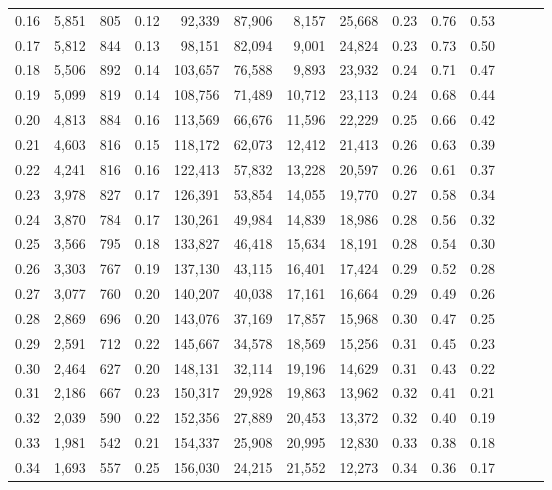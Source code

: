 \begin{tabular}{rrrrrrrrrrrrrr}
0.16 &  5,851 &  805 &  0.12 &   92,339 &   87,906 &   8,157 &  25,668 &  0.23 &  0.76 &      0.53 \\
0.17 &  5,812 &  844 &  0.13 &   98,151 &   82,094 &   9,001 &  24,824 &  0.23 &  0.73 &      0.50 \\
0.18 &  5,506 &  892 &  0.14 &  103,657 &   76,588 &   9,893 &  23,932 &  0.24 &  0.71 &      0.47 \\
0.19 &  5,099 &  819 &  0.14 &  108,756 &   71,489 &  10,712 &  23,113 &  0.24 &  0.68 &      0.44 \\
0.20 &  4,813 &  884 &  0.16 &  113,569 &   66,676 &  11,596 &  22,229 &  0.25 &  0.66 &      0.42 \\
0.21 &  4,603 &  816 &  0.15 &  118,172 &   62,073 &  12,412 &  21,413 &  0.26 &  0.63 &      0.39 \\
0.22 &  4,241 &  816 &  0.16 &  122,413 &   57,832 &  13,228 &  20,597 &  0.26 &  0.61 &      0.37 \\
0.23 &  3,978 &  827 &  0.17 &  126,391 &   53,854 &  14,055 &  19,770 &  0.27 &  0.58 &      0.34 \\
0.24 &  3,870 &  784 &  0.17 &  130,261 &   49,984 &  14,839 &  18,986 &  0.28 &  0.56 &      0.32 \\
0.25 &  3,566 &  795 &  0.18 &  133,827 &   46,418 &  15,634 &  18,191 &  0.28 &  0.54 &      0.30 \\
0.26 &  3,303 &  767 &  0.19 &  137,130 &   43,115 &  16,401 &  17,424 &  0.29 &  0.52 &      0.28 \\
0.27 &  3,077 &  760 &  0.20 &  140,207 &   40,038 &  17,161 &  16,664 &  0.29 &  0.49 &      0.26 \\
0.28 &  2,869 &  696 &  0.20 &  143,076 &   37,169 &  17,857 &  15,968 &  0.30 &  0.47 &      0.25 \\
0.29 &  2,591 &  712 &  0.22 &  145,667 &   34,578 &  18,569 &  15,256 &  0.31 &  0.45 &      0.23 \\
0.30 &  2,464 &  627 &  0.20 &  148,131 &   32,114 &  19,196 &  14,629 &  0.31 &  0.43 &      0.22 \\
0.31 &  2,186 &  667 &  0.23 &  150,317 &   29,928 &  19,863 &  13,962 &  0.32 &  0.41 &      0.21 \\
0.32 &  2,039 &  590 &  0.22 &  152,356 &   27,889 &  20,453 &  13,372 &  0.32 &  0.40 &      0.19 \\
0.33 &  1,981 &  542 &  0.21 &  154,337 &   25,908 &  20,995 &  12,830 &  0.33 &  0.38 &      0.18 \\
0.34 &  1,693 &  557 &  0.25 &  156,030 &   24,215 &  21,552 &  12,273 &  0.34 &  0.36 &      0.17 \\

\end{tabular}
